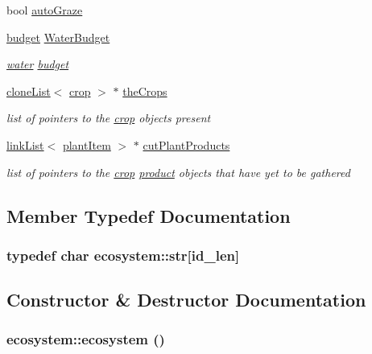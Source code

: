 \begin{DoxyCompactItemize}
bool \hyperlink{classecosystem_ae02968a4af70884e35543b24d2f3b17a}{autoGraze}
\item 
\hyperlink{classbudget}{budget} \hyperlink{classecosystem_a08137c3fd93a93cc284bf3e8ad217222}{WaterBudget}
\begin{DoxyCompactList}\small\item\em \hyperlink{classwater}{water} \hyperlink{classbudget}{budget} \item\end{DoxyCompactList}\item 
\hyperlink{classclone_list}{cloneList}$<$ \hyperlink{classcrop}{crop} $>$ $\ast$ \hyperlink{classecosystem_a5b32df2d08cd4a986e3e0773b858dfdf}{theCrops}
\begin{DoxyCompactList}\small\item\em list of pointers to the \hyperlink{classcrop}{crop} objects present \item\end{DoxyCompactList}\item 
\hyperlink{classlink_list}{linkList}$<$ \hyperlink{classplant_item}{plantItem} $>$ $\ast$ \hyperlink{classecosystem_a5ed20a16967029b1bd8cbd5d03af0223}{cutPlantProducts}
\begin{DoxyCompactList}\small\item\em list of pointers to the \hyperlink{classcrop}{crop} \hyperlink{classproduct}{product} objects that have yet to be gathered \item\end{DoxyCompactList}\end{DoxyCompactItemize}


\subsection{Member Typedef Documentation}
\hypertarget{classecosystem_aba225e015239959504f5d8eb23064948}{
\subsubsection[{str}]{\setlength{\rightskip}{0pt plus 5cm}typedef char {\bf ecosystem::str}\mbox{[}id\_\-len\mbox{]}}}
\label{classecosystem_aba225e015239959504f5d8eb23064948}


\subsection{Constructor \& Destructor Documentation}
\hypertarget{classecosystem_aa4a78b7909049a2e4a0208e446e0028c}{
\subsubsection[{ecosystem}]{\setlength{\rightskip}{0pt plus 5cm}ecosystem::ecosystem ()}}
\label{classecosystem_aa4a78b7909049a2e4a0208e446e0028c}


